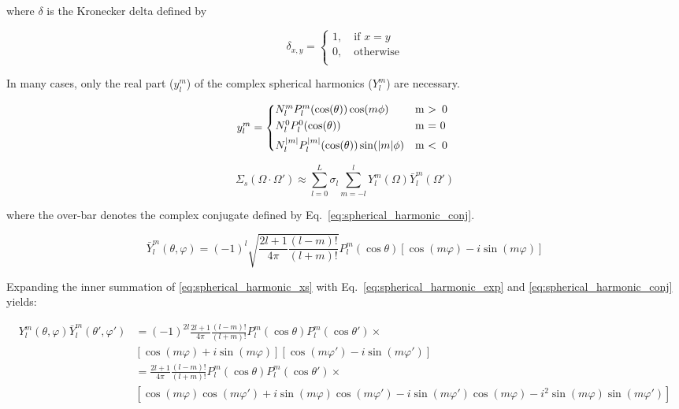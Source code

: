\documentclass{article}
\numberwithin{equation}{subsection}
\begin{document}
where $\delta$ is the Kronecker delta defined by

\begin{equation}
\delta_{x,y} =
\begin{cases*}
1,  \quad \text{if } x = y \\
0, \quad \text{otherwise} \\
\end{cases*}
\end{equation}

In many cases, only the real part ($y_l^m$) of the complex spherical harmonics ($Y_l^m$) are necessary. 

\begin{equation}
y_l^m =
\begin{cases*}
N_l^m P_l^m(\cos(\theta)) \cos(m\phi) & m \textgreater \, 0  \\
N_l^0 P_l^0(\cos(\theta)) & m = 0 \\
N_l^{|m|} P_l^{|m|}(\cos(\theta)) \sin(|m| \phi) & m \textless \, 0 
\end{cases*}
\end{equation}

\begin{equation}\label{eq:spherical_harmonic_xs}
\Sigma_s(\Omega \cdot \Omega') \approx \sum_{l=0}^L \sigma_l \sum_{m=-l}^l Y_l^m(\Omega)\bar{Y}_l^m(\Omega')
\end{equation}

where the over-bar denotes the complex conjugate defined by Eq.~\ref{eq:spherical_harmonic_conj}.

\begin{equation}\label{eq:spherical_harmonic_conj}
\bar{Y}_l^m(\theta, \varphi) = (-1)^{l}\sqrt{\frac{2l+1}{4 \pi}
\frac{(l-m)!}{(l+m)!}} P_l^m(\cos \theta) \left[ \cos(m \varphi) - i \sin(m \varphi) \right]
\end{equation}

Expanding the inner summation of \ref{eq:spherical_harmonic_xs} with Eq.~\ref{eq:spherical_harmonic_exp} and \ref{eq:spherical_harmonic_conj} yields:

\begin{equation}\label{eq:spherical_harmonic_xs_inner}
\begin{split}
Y_l^m(\theta, \varphi)\bar{Y}_l^m(\theta', \varphi') & = 
(-1)^{2l}\frac{2l+1}{4 \pi}
\frac{(l-m)!}{(l+m)!} P_l^m(\cos \theta) P_l^m(\cos \theta') \times \\
&\left[ \cos(m \varphi) + i \sin(m \varphi) \right] \left[ \cos(m \varphi') - i \sin(m \varphi') \right] \\
& = \frac{2l+1}{4 \pi}
\frac{(l-m)!}{(l+m)!} P_l^m(\cos \theta) P_l^m(\cos \theta') \times \\
& \left[ \cos(m \varphi) \cos(m \varphi') + i \sin(m \varphi)\cos(m \varphi') - i \sin(m \varphi') \cos(m \varphi) - i^2\sin(m \varphi) \sin(m \varphi') \right]
\end{split}
\end{equation}
\end{document}
